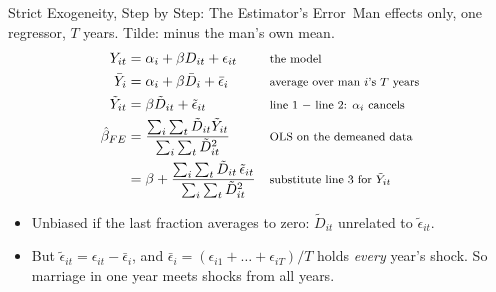 \documentclass[aspectratio=169,11pt,xcolor=dvipsnames]{beamer}
\newcommand{\adv}{\,\raisebox{0.6pt}{\textcolor{accent}{$\bigstar$}}}
\begin{document}
\begin{frame}{Strict Exogeneity, Step by Step: The Estimator's Error\adv}
Man effects only, one regressor, $T$ years. Tilde: minus the man's own mean.
\begin{align*}
  Y_{it} &= \alpha_i + \beta D_{it} + \epsilon_{it}
   && \text{\footnotesize the model} \\
  \bar Y_{i} &= \alpha_i + \beta \bar D_{i} + \bar\epsilon_{i}
   && \text{\footnotesize average over man $i$'s $T$ years} \\
  \tilde Y_{it} &= \beta \tilde D_{it} + \tilde\epsilon_{it}
   && \text{\footnotesize line 1 $-$ line 2: $\alpha_i$ cancels} \\
  \hat\beta_{FE} &= \frac{\sum_i\sum_t \tilde D_{it}\tilde Y_{it}}{\sum_i\sum_t \tilde D_{it}^2}
   && \text{\footnotesize OLS on the demeaned data} \\
  &= \beta + \frac{\sum_i\sum_t \tilde D_{it}\,\tilde\epsilon_{it}}{\sum_i\sum_t \tilde D_{it}^2}
   && \text{\footnotesize substitute line 3 for $\tilde Y_{it}$}
\end{align*}
\begin{itemize}\itemsep3pt
  \item Unbiased if the last fraction averages to zero: $\tilde D_{it}$ unrelated to
        $\tilde\epsilon_{it}$.
  \item But $\tilde\epsilon_{it} = \epsilon_{it} - \bar\epsilon_i$, and
        $\bar\epsilon_i = (\epsilon_{i1} + \dots + \epsilon_{iT})/T$ holds \emph{every} year's
        shock. So marriage in one year meets shocks from all years.
\end{itemize}
\end{frame}
\end{document}
